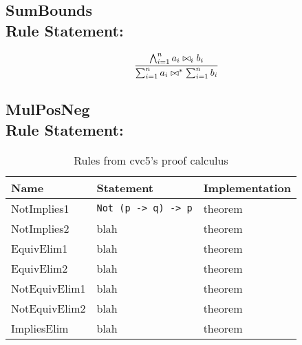 
\subsection*{SumBounds\\\normalsize{Rule Statement:}}
\[
  \infer[]{\sum_{i = 1}^{n} a_{i} \bowtie^{*} \sum_{i = 1}^{n} b_{i}}{\bigwedge_{i = 1}^{n} a_{i} \bowtie_{i} b_{i}}
\]

\subsection*{MulPosNeg\\\normalsize{Rule Statement:}}





\begin{table}[]\label{tab:rules}
\centering
\begin{tabular}{ l l l }
\toprule
Name        & Statement & Implementation \\ \midrule
NotImplies1 & \texttt{Not (p -> q) -> p}      & theorem        \\ \midrule
NotImplies2 & blah      & theorem        \\ \midrule
EquivElim1  & blah      & theorem        \\ \midrule
EquivElim2  & blah      & theorem        \\ \midrule
NotEquivElim1  & blah      & theorem        \\ \midrule
NotEquivElim2  & blah      & theorem        \\ \midrule
ImpliesElim & blah      & theorem        \\ \bottomrule
\end{tabular}
\caption{Rules from cvc5's proof calculus}
\end{table}

